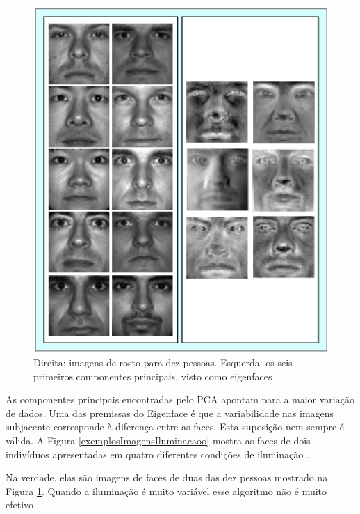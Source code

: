 	\begin{figure}[hbt]
		\begin{center}
			\includegraphics[width=12cm]{figuras/2.FundamentacaoTeorica/eigenfaces.png}
		\end{center}
		\caption{Direita: imagens de rosto para dez pessoas. Esquerda: os seis primeiros componentes principais, visto como eigenfaces \cite{hewitt}.}
		\label{exemploEigenfaces}
	\end{figure}

As componentes principais encontradas pelo PCA apontam para a maior variação de dados. Uma das premissas do Eigenface é que a variabilidade nas imagens subjacente corresponde à diferença entre as faces. Esta suposição nem sempre é válida. A Figura \ref{exemplosImagensIluminacaoo} mostra as faces de dois indivíduos apresentadas em quatro diferentes condições de iluminação \cite{hewitt}.

Na verdade, elas são imagens de faces de duas das dez pessoas mostrado na Figura \ref{exemploEigenfaces}. Quando a iluminação é muito variável esse algoritmo não é muito efetivo \cite{hewitt}.

